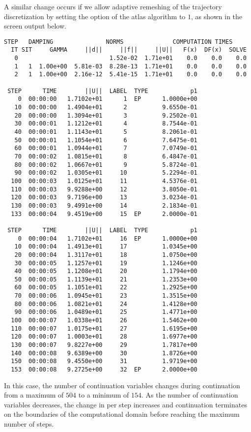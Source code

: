 A similar change occurs if we allow adaptive remeshing of the trajectory discretization by setting the  option of the atlas algorithm to $1$, as shown in the screen output below.
\begin{lstlisting}[language=coco-highlight]
    STEP   DAMPING               NORMS              COMPUTATION TIMES
  IT SIT     GAMMA     ||d||     ||f||     ||U||   F(x)  DF(x)  SOLVE
   0                          1.52e-02  1.71e+01    0.0    0.0    0.0
   1   1  1.00e+00  5.81e-03  8.28e-13  1.71e+01    0.0    0.0    0.0
   2   1  1.00e+00  2.16e-12  5.41e-15  1.71e+01    0.0    0.0    0.0

 STEP      TIME        ||U||  LABEL  TYPE            p1
    0  00:00:00   1.7102e+01      1  EP      1.0000e+00
   10  00:00:00   1.4904e+01      2          9.6550e-01
   20  00:00:00   1.3094e+01      3          9.2502e-01
   30  00:00:01   1.1212e+01      4          8.7544e-01
   40  00:00:01   1.1143e+01      5          8.2061e-01
   50  00:00:01   1.1054e+01      6          7.6475e-01
   60  00:00:01   1.0944e+01      7          7.0749e-01
   70  00:00:02   1.0815e+01      8          6.4847e-01
   80  00:00:02   1.0667e+01      9          5.8724e-01
   90  00:00:02   1.0305e+01     10          5.2294e-01
  100  00:00:03   1.0125e+01     11          4.5376e-01
  110  00:00:03   9.9288e+00     12          3.8050e-01
  120  00:00:03   9.7196e+00     13          3.0234e-01
  130  00:00:03   9.4991e+00     14          2.1834e-01
  133  00:00:04   9.4519e+00     15  EP      2.0000e-01

 STEP      TIME        ||U||  LABEL  TYPE            p1
    0  00:00:04   1.7102e+01     16  EP      1.0000e+00
   10  00:00:04   1.4913e+01     17          1.0345e+00
   20  00:00:04   1.3117e+01     18          1.0750e+00
   30  00:00:05   1.1257e+01     19          1.1246e+00
   40  00:00:05   1.1208e+01     20          1.1794e+00
   50  00:00:05   1.1139e+01     21          1.2353e+00
   60  00:00:05   1.1051e+01     22          1.2925e+00
   70  00:00:06   1.0945e+01     23          1.3515e+00
   80  00:00:06   1.0821e+01     24          1.4128e+00
   90  00:00:06   1.0489e+01     25          1.4771e+00
  100  00:00:07   1.0338e+01     26          1.5462e+00
  110  00:00:07   1.0175e+01     27          1.6195e+00
  120  00:00:07   1.0003e+01     28          1.6977e+00
  130  00:00:07   9.8227e+00     29          1.7817e+00
  140  00:00:08   9.6389e+00     30          1.8726e+00
  150  00:00:08   9.4550e+00     31          1.9719e+00
  153  00:00:08   9.2725e+00     32  EP      2.0000e+00
\end{lstlisting}
In this case, the number of continuation variables changes during continuation from a maximum of $504$ to a minimum of $154$. As the number of continuation variables decreases, the change in  per step increases and continuation terminates on the boundaries of the computational domain before reaching the maximum number of steps.

